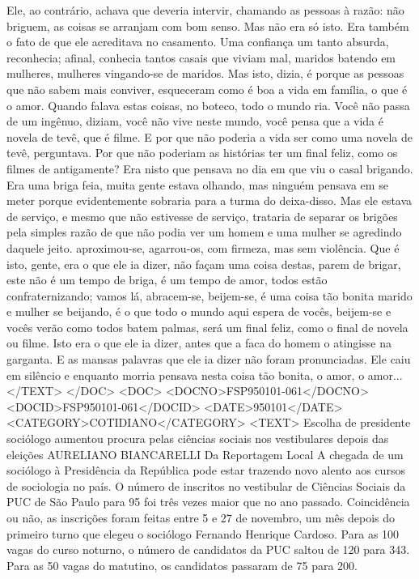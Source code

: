 Ele, ao contrário, achava que deveria intervir, chamando as pessoas à razão: não briguem, as coisas se arranjam com bom senso.
Mas não era só isto. Era também o fato de que ele acreditava no casamento. Uma confiança um tanto absurda, reconhecia; afinal, conhecia tantos casais que viviam mal, maridos batendo em mulheres, mulheres vingando-se de maridos. Mas isto, dizia, é porque as pessoas que não sabem mais conviver, esqueceram como é boa a vida em família, o que é o amor.
Quando falava estas coisas, no boteco, todo o mundo ria. Você não passa de um ingênuo, diziam, você não vive neste mundo, você pensa que a vida é novela de tevê, que é filme. E por que não poderia a vida ser como uma novela de tevê, perguntava. Por que não poderiam as histórias ter um final feliz, como os filmes de antigamente?
Era nisto que pensava no dia em que viu o casal brigando. Era uma briga feia, muita gente estava olhando, mas ninguém pensava em se meter porque evidentemente sobraria para a turma do deixa-disso. Mas ele estava de serviço, e mesmo que não estivesse de serviço, trataria de separar os brigões pela simples razão de que não podia ver um homem e uma mulher se agredindo daquele jeito.
aproximou-se, agarrou-os, com firmeza, mas sem violência. Que é isto, gente, era o que ele ia dizer, não façam uma coisa destas, parem de brigar, este não é um tempo de briga, é um tempo de amor, todos estão confraternizando; vamos lá, abracem-se, beijem-se, é uma coisa tão bonita marido e mulher se beijando, é o que todo o mundo aqui espera de vocês, beijem-se e vocês verão como todos batem palmas, será um final feliz, como o final de novela ou filme.
Isto era o que ele ia dizer, antes que a faca do homem o atingisse na garganta. E as mansas palavras que ele ia dizer não foram pronunciadas. Ele caiu em silêncio e enquanto morria pensava nesta coisa tão bonita, o amor, o amor...
</TEXT>
</DOC>
<DOC>
<DOCNO>FSP950101-061</DOCNO>
<DOCID>FSP950101-061</DOCID>
<DATE>950101</DATE>
<CATEGORY>COTIDIANO</CATEGORY>
<TEXT>
Escolha de presidente sociólogo aumentou procura pelas ciências sociais nos vestibulares depois das eleições 
AURELIANO BIANCARELLI 
Da Reportagem Local 
A chegada de um sociólogo à Presidência da República pode estar trazendo novo alento aos cursos de sociologia no país. O número de inscritos no vestibular de Ciências Sociais da PUC de São Paulo para 95 foi três vezes maior que no ano passado.
Coincidência ou não, as inscrições foram feitas entre 5 e 27 de novembro, um mês depois do primeiro turno que elegeu o sociólogo Fernando Henrique Cardoso. Para as 100 vagas do curso noturno, o número de candidatos da PUC saltou de 120 para 343. Para as 50 vagas do matutino, os candidatos passaram de 75 para 200.
